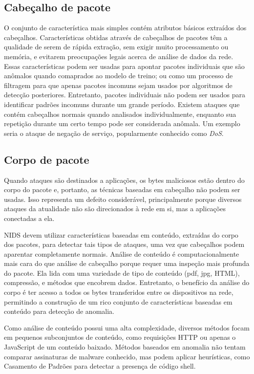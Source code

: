 \subsection{Cabeçalho de pacote}
O conjunto de característica mais simples contém atributos básicos extraídos dos cabeçalhos.
Características obtidas através de  cabeçalhos de pacotes têm a qualidade de serem de rápida extração, sem exigir muito
processamento ou memória, e evitarem preocupações legais acerca de análise de dados da rede.
Essas características podem ser usadas para apontar pacotes individuais que são anômalos quando comaprados ao modelo de
treino; ou como um processo de filtragem para que apenas pacotes incomuns sejam usados por algoritmos de detecção
posteriores.
Entretanto, pacotes individuais não podem ser usados para identificar padrões incomuns durante um grande período.
Existem ataques que contém cabeçalhos normais quando analisados individualmente, enquanto sua repetição durante
um certo tempo pode ser considerada anômala. Um exemplo seria o ataque de negação de serviço, popularmente conhecido
como \textit{DoS}.

\subsection{Corpo de pacote}
Quando ataques são destinados a aplicações, os bytes maliciosos estão dentro do corpo do
pacote e, portanto, as técnicas baseadas em cabeçalho não podem ser usadas. Isso representa um defeito considerável,
principalmente porque diversos ataques da atualidade não são direcionados à rede em si, mas a aplicações conectadas a
ela.
\par NIDS devem utilizar características baseadas em conteúdo, extraídas do corpo dos pacotes, para detectar tais tipos 
de ataques, uma vez que cabeçalhos podem aparentar completamente normais. Análise de conteúdo é computacionalmente 
mais cara do que análise de cabeçalho porque requer uma inspeção mais profunda do pacote. Ela lida com uma variedade de
tipo de conteúdo (pdf, jpg, HTML), compressão, e métodos que encobrem dados. Entretanto, o benefício da análise do
corpo é ter acesso a todos os bytes transferidos entre os dispositivos na rede, permitindo a construção de um rico
conjunto de características baseadas em conteúdo para detecção de anomalia.
\par Como análise de conteúdo possui uma alta complexidade, diversos métodos focam em pequenos subconjuntos de
conteúdo, como requisições HTTP ou apenas o JavaScript de um conteúdo baixado. Métodos baseados em anomalia não tentam
comparar assinaturas de malware conhecido, mas podem aplicar heurísticas, como Casamento de Padrões para detectar a
presença de código shell.

